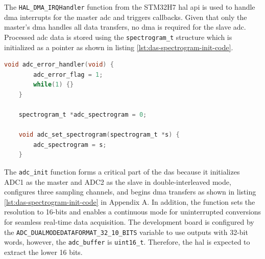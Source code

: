 \documentclass[class=report,11pt,crop=false]{standalone}
\begin{document}
	The \texttt{HAL\_DMA\_IRQHandler} function from the STM32H7 \acrshort{hal} \acrshort{api} is used to handle \acrshort{dma} interrupts for the master \acrshort{adc} and triggers callbacks. Given that only the master's \acrshort{dma} handles all data transfers, no \acrshort{dma} is required for the slave \acrshort{adc}. Processed \acrshort{adc} data is stored using the \texttt{spectrogram\_t} structure which is initialized as a pointer as shown in listing \ref{lst:das-spectrogram-init-code}. 
	
	\begin{lstlisting}[language=C, label={lst:das-spectrogram-init-code}, caption={The \texttt{HAL\_DMA\_IRQHandler} function is used to handle \acrshort{dma} transfers while the \texttt{adc\_set\_spectrogram(spectrogram\_t *s)} function is used to initialize a pointer to a \texttt{spectrogram} structure.}]
	void adc_error_handler(void) {
		adc_error_flag = 1;
		while(1) {}
	}
	
	spectrogram_t *adc_spectrogram = 0;
	
	void adc_set_spectrogram(spectrogram_t *s) {
		adc_spectrogram = s;
	}
	\end{lstlisting}
	
	The \texttt{adc\_init} function forms a critical part of the \acrshort{das} because it initializes ADC1 as the master and ADC2 as the slave in double-interleaved mode, configures three sampling channels, and begins \acrshort{dma} transfers as shown in listing \ref{lst:das-spectrogram-init-code} in Appendix A. In addition, the function sets the resolution to 16-bits and enables a continuous mode for uninterrupted conversions for seamless real-time data acquisition. The development board is configured by the \texttt{ADC\_DUALMODEDATAFORMAT\_32\_10\_BITS} variable to use outputs with 32-bit words, however, the \texttt{adc\_buffer} is \texttt{uint16\_t}. Therefore, the \acrshort{hal} is expected to extract the lower 16 bits. 
	
\end{document}

